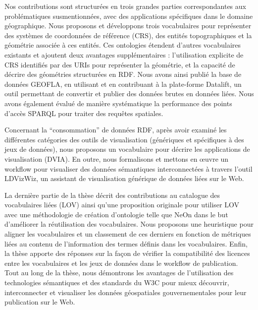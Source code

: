 Nos contributions sont structur\'{e}es en trois grandes parties correspondantes aux probl\'{e}matiques susmentionn\'{e}es, avec des applications sp\'{e}cifiques dans le domaine g\'{e}ographique. Nous proposons et d\'{e}veloppons trois vocabulaires pour repr\'{e}senter des syst\`{e}mes de coordonn\'{e}es de r\'{e}f\'{e}rence (CRS), des entit\'{e}s topographiques et la g\'{e}om\'{e}trie associ\'{e}e à ces entit\'{e}s. Ces ontologies \'{e}tendent d'autres vocabulaires existants et ajoutent deux avantages suppl\'{e}mentaires : l’utilisation explicite de CRS identifi\'{e}s par des URIs pour repr\'{e}senter la g\'{e}om\'{e}trie, et la capacit\'{e} de d\'{e}crire des g\'{e}om\'{e}tries structur\'{e}es en RDF. Nous avons ainsi publi\'{e} la base de donn\'{e}es GEOFLA, en utilisant et en contribuant à la plate-forme Datalift, un outil permettant de convertir et publier des donn\'{e}es brutes en donn\'{e}es li\'{e}es. Nous avons \'{e}galement \'{e}valu\'{e} de mani\`{e}re syst\'{e}matique la performance des points d'acc\`{e}s SPARQL pour traiter des requ\^{e}tes spatiales.

Concernant la ``consommation'' de donn\'{e}es RDF, apr\`{e}s avoir examin\'{e} les diff\'{e}rentes cat\'{e}gories des outils de visualisation (g\'{e}n\'{e}riques et sp\'{e}cifiques à des jeux de donn\'{e}es), nous proposons un vocabulaire pour d\'{e}crire les applications de visualisation (DVIA). En outre, nous formalisons et mettons en œuvre un workflow pour visualiser des donn\'{e}es s\'{e}mantiques interconnect\'{e}es à travers l'outil LDVizWiz, un assistant de visualisation g\'{e}n\'{e}rique de donn\'{e}es li\'{e}es sur le Web.

La derni\`{e}re partie de la th\`{e}se d\'{e}crit des contributions au catalogue des vocabulaires li\'{e}es (LOV) ainsi qu'une proposition originale pour utiliser LOV avec une m\'{e}thodologie de cr\'{e}ation d'ontologie telle que NeOn dans le but d'am\'{e}liorer la r\'{e}utilisation des vocabulaires. Nous proposons une heuristique pour aligner les vocabulaires et un classement de ces derniers en fonction de m\'{e}triques li\'{e}es au contenu de l'information des termes d\'{e}finis dans les vocabulaires. Enfin, la th\`{e}se apporte des r\'{e}ponses sur la façon de v\'{e}rifier la compatibilit\'{e} des licences entre les vocabulaires et les jeux de donn\'{e}es dans le workflow de publication. Tout au long de la th\`{e}se, nous d\'{e}montrons les avantages de l'utilisation des technologies s\'{e}mantiques et des standards du W3C pour mieux d\'{e}couvrir, interconnecter et visualiser les donn\'{e}es g\'{e}ospatiales gouvernementales pour leur publication sur le Web.

